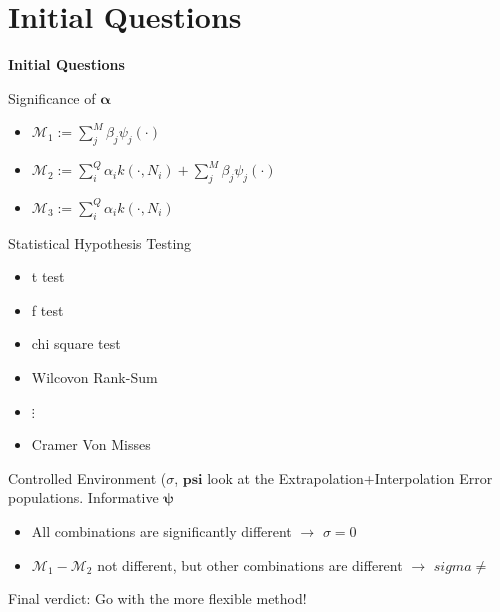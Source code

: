 \documentclass[aspectratio=169]{beamer}
\newcommand{\res}{\color{Pink}\huge{\textbf{Initial Questions}}}
\newcommand{\nsampi}{N_i}
\newcommand{\nsamplr}{Q}
\newcommand{\numlc}{M}
\newcommand{\model}{\mathcal{M}}
\begin{document}
\section{Initial Questions}
\begin{frame}
	\centering
	\res
\end{frame}

\begin{frame}{Significance of $\boldsymbol{\alpha}$}
  \begin{minipage}{0.5\textwidth}
    {
    }
    {
    \begin{itemize}
    \item $\model_1:=\sum_j^\numlc\beta_j\psi_j(\cdot)$
    \item $\model_2:=\sum_i^\nsamplr\alpha_i k(\cdot,\nsampi)+\sum_j^\numlc\beta_j\psi_j(\cdot)$
    \item $\model_3:=\sum_i^\nsamplr\alpha_i k(\cdot,\nsampi)$
    \end{itemize}
    }
  \end{minipage}%
  \begin{minipage}{0.5\textwidth}
    {
    Statistical Hypothesis Testing
    \begin{itemize}
      \item t test
      \item f test
      \item chi square test
      \item Wilcovon Rank-Sum 
      \item $\vdots$
      \item \color{Pink} Cramer Von Misses
    \end{itemize}
    }
    {
      Controlled Environment ($\sigma$, $\boldsymbol{psi}$ look at the Extrapolation+Interpolation Error populations.
      Informative $\boldsymbol{\psi}$ 
      \begin{itemize}
        \item All combinations are significantly different $\to$ $\sigma=0$
        \item $\model_1-\model_2$ not different, but other combinations are different  $\to$ $sigma\neq$
      \end{itemize}
    }
  \end{minipage}
  {\color{Pink} Final verdict: Go with the more flexible method!}
\end{frame}
\end{document}
